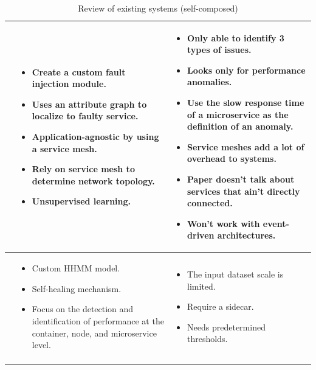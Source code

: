 \begin{longtable}{| p{25mm} | p{62mm} | p{62mm} |}
    \cite{wu2020microrca} &
    \vspace{-8mm}
    \begin{itemize}[leftmargin=3mm,noitemsep,nolistsep] 
        \item Create a custom fault injection module.
        \item Uses an attribute graph to localize to faulty service.
        \item Application-agnostic by using a service mesh.
        \item Rely on service mesh to determine network topology.
        \item  Unsupervised learning.
        \vspace{-7mm}
    \end{itemize} &
    \vspace{-8mm}
    \begin{itemize}[leftmargin=3mm,noitemsep,nolistsep] 
        \item Only able to identify 3 types of issues.
        \item Looks only for performance anomalies.
        \item Use the slow response time of a microservice as the definition of an anomaly.
        \item Service meshes add a lot of overhead to systems.
        \item Paper doesn't talk about services that ain't directly connected.
        \item Won't work with event-driven architectures.
        \vspace{-7mm}
    \end{itemize} \\ \hline

    \cite{samir2019dla} &
    \vspace{-8mm}
    \begin{itemize}[leftmargin=3mm,noitemsep,nolistsep] 
        \item Custom HHMM model.
        \item Self-healing mechanism.
        \item Focus on the detection and identification of performance at the container, node, and microservice level.
        \vspace{-7mm}
    \end{itemize} &
    \vspace{-8mm}
    \begin{itemize}[leftmargin=3mm,noitemsep,nolistsep] 
        \item The input dataset scale is limited.
        \item Require a sidecar.
        \item Needs predetermined thresholds.
        \vspace{-7mm}
    \end{itemize} \\ \hline
    
    \caption{Review of existing systems (self-composed)}
\end{longtable}


